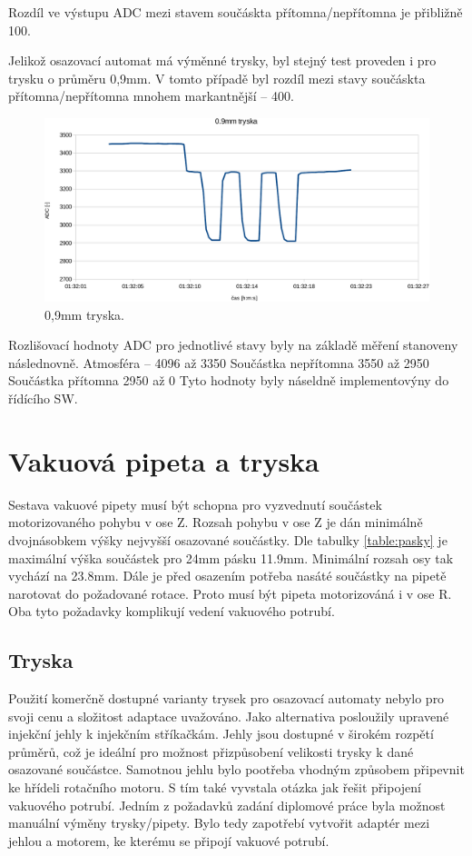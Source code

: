 Rozdíl ve výstupu ADC mezi stavem součáskta přítomna/nepřítomna je přibližně 100.

Jelikož osazovací automat má výměnné trysky, byl stejný test proveden i pro trysku o průměru 0,9mm. V tomto případě byl rozdíl mezi stavy součáskta přítomna/nepřítomna mnohem markantnější – 400.

\begin{figure}[h!]
  \centering
    \includegraphics[width=0.9\linewidth]{pdf/9mm-crop2.pdf}%
    \caption{0,9mm tryska.}
    \label{fig:sensor}
\end{figure}


Rozlišovací hodnoty ADC pro jednotlivé stavy byly na základě měření stanoveny následnovně.
Atmosféra – 4096 až 3350
Součástka nepřítomna 3550 až 2950
Součástka přítomna 2950 až 0
Tyto hodnoty byly náseldně implementovýny do řídícího SW.


\section{Vakuová pipeta a tryska}
Sestava vakuové pipety musí být schopna pro vyzvednutí součástek motorizovaného pohybu v ose Z. Rozsah pohybu v ose Z je dán minimálně dvojnásobkem výšky nejvyšší osazované součástky. Dle tabulky \ref{table:pasky} je maximální výška součástek pro 24mm pásku 11.9mm. Minimální rozsah osy tak vychází na 23.8mm. Dále je před osazením potřeba nasáté součástky na pipetě narotovat do požadované rotace. Proto musí být pipeta motorizováná i v ose R. Oba tyto požadavky komplikují vedení vakuového potrubí.

\subsection{Tryska}
Použití komerčně dostupné varianty trysek pro osazovací automaty nebylo pro svoji cenu a složitost adaptace uvažováno. Jako alternativa posloužily upravené injekční jehly k injekčním stříkačkám. Jehly jsou dostupné v širokém rozpětí průměrů, což je ideální pro možnost přizpůsobení velikosti trysky k dané osazované součástce. Samotnou jehlu bylo pootřeba vhodným způsobem připevnit ke hřídeli rotačního motoru. S tím také vyvstala otázka jak řešit připojení vakuového potrubí. 
Jedním z požadavků zadání diplomové práce byla možnost manuální výměny trysky/pipety. Bylo tedy zapotřebí vytvořit adaptér mezi jehlou a motorem, ke kterému se připojí vakuové potrubí.


